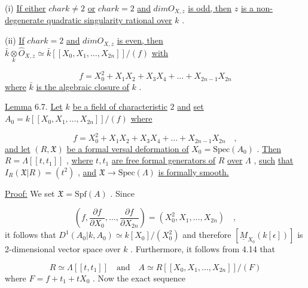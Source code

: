 (i)  \underline{If either}  $char k \neq 2$  \underline{or}  $char k = 2$  \underline{and}  $dim O_{X,z}$  \underline{is odd, then} $z$  \underline{is a non-degenerate quadratic singularity rational over}  $k$  .

(ii)  \underline{If}  $char k = 2$  \underline{and}  $dim O_{X,z}$  \underline{is even, then} $\bar{k} \underset{k}{\otimes} \hat{O}_{X,z} \simeq \bar{k}[[X_0, X_1, \ldots, X_{2n}]]/(f)$  \underline{with}

\begin{equation*}
f = X_0^2 + X_1X_2 + X_3X_4 + \ldots + X_{2n-1}X_{2n}
\end{equation*}
\underline{where}  $\bar{k}$  \underline{is the algebraic closure of}  $k$  .

\underline{Lemma} 6.7.  \underline{Let}  $k$  \underline{be a field of characteristic}  $2$  \underline{and}  \underline{set} $A_0 = k[[X_0, X_1, \ldots ,X_{2n}]]/(f)$  \underline{where}

\begin{equation*}
f = X_0^2 + X_1X_2 + X_3X_4 + \ldots + X_{2n-1}X_{2n} \quad ,
\end{equation*}
\underline{and let}  $(R, \mathfrak{X})$  \underline{be a formal versal deformation of}  $X_0 = \mathrm{Spec}(A_0)$  . \underline{Then} $R = \Lambda[[t, t_1]]$  , \underline{where}  $t, t_1$  \underline{are free formal generators of}  $R$  \underline{over}  $\Lambda$  , \underline{such} \underline{that}  $I_R(\mathfrak{X}|R) = (t^2)$  , \underline{and}  $\mathfrak{X} \to \mathrm{Spec}(\Lambda)$  \underline{is formally smooth.}

\underline{Proof:}  We set  $\mathfrak{X} = \mathrm{Spf}(A)$  . Since

\begin{equation*}
(f, \frac{\partial f}{\partial X_0} , \ldots , \frac{\partial f}{\partial X_{2n}} ) = (X_0^2, X_1, \ldots , X_{2n}) \quad ,
\end{equation*}
it follows that  $D^1(A_0|k, A_0) \simeq  k[X_0]/(X_0^2)$  and therefore  $[\underline{M}_{X_0}(k[\epsilon])]$  is 2-dimensional vector space over  $k$  . Furthermore, it follows from 4.14 that

\begin{equation*}
R \simeq \Lambda[[t, t_1]] \quad \text{and} \quad A \simeq R[[X_0, X_1, \ldots ,X_{2n}]]/(F)
\end{equation*}
where  $F = f + t_1 + tX_0$  . Now the exact sequence


